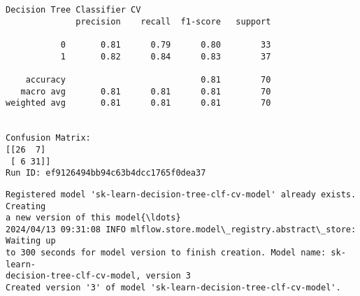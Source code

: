 \documentclass[11pt]{article}
\begin{document}
    \begin{Verbatim}[commandchars=\\\{\}]
Decision Tree Classifier CV
              precision    recall  f1-score   support

           0       0.81      0.79      0.80        33
           1       0.82      0.84      0.83        37

    accuracy                           0.81        70
   macro avg       0.81      0.81      0.81        70
weighted avg       0.81      0.81      0.81        70


Confusion Matrix:
[[26  7]
 [ 6 31]]
Run ID: ef9126494bb94c63b4dcc1765f0dea37
    \end{Verbatim}

    \begin{Verbatim}[commandchars=\\\{\}]
Registered model 'sk-learn-decision-tree-clf-cv-model' already exists. Creating
a new version of this model{\ldots}
2024/04/13 09:31:08 INFO mlflow.store.model\_registry.abstract\_store: Waiting up
to 300 seconds for model version to finish creation. Model name: sk-learn-
decision-tree-clf-cv-model, version 3
Created version '3' of model 'sk-learn-decision-tree-clf-cv-model'.
    \end{Verbatim}
\end{document}
